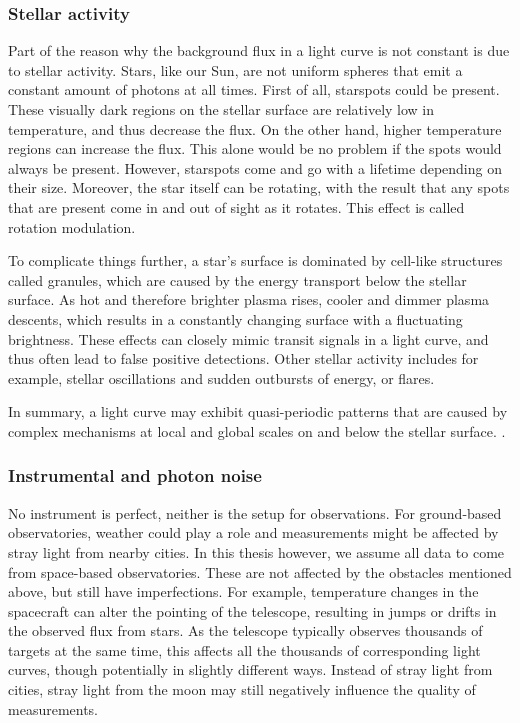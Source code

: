 \subsubsection{Stellar activity}

Part of the reason why the background flux in a light curve is not constant is due to stellar activity. Stars, like our Sun, are not uniform spheres that emit a constant amount of photons at all times. First of all, starspots could be present. These visually dark regions on the stellar surface are relatively low in temperature, and thus decrease the flux. On the other hand, higher temperature regions can increase the flux. This alone would be no problem if the spots would always be present. However, starspots come and go with a lifetime depending on their size. Moreover, the star itself can be rotating, with the result that any spots that are present come in and out of sight as it rotates. This effect is called rotation modulation. 

To complicate things further, a star's surface is dominated by cell-like structures called granules, which are caused by the energy transport below the stellar surface. As hot and therefore brighter plasma rises, cooler and dimmer plasma descents, which results in a constantly changing surface with a fluctuating brightness. These effects can closely mimic transit signals in a light curve, and thus often lead to false positive detections. Other stellar activity includes for example, stellar oscillations and sudden outbursts of energy, or flares.

In summary, a light curve may exhibit quasi-periodic patterns that are caused by complex mechanisms at local and global scales on and below the stellar surface. .

\subsubsection{Instrumental and photon noise}

No instrument is perfect, neither is the setup for observations. For ground-based observatories, weather could play a role and measurements might be affected by stray light from nearby cities. In this thesis however, we assume all data to come from space-based observatories. These are not affected by the obstacles mentioned above, but still have imperfections. For example, temperature changes in the spacecraft can alter the pointing of the telescope, resulting in jumps or drifts in the observed flux from stars. As the telescope typically observes thousands of targets at the same time, this affects all the thousands of corresponding light curves, though potentially in slightly different ways. Instead of stray light from cities, stray light from the moon may still negatively influence the quality of measurements.

